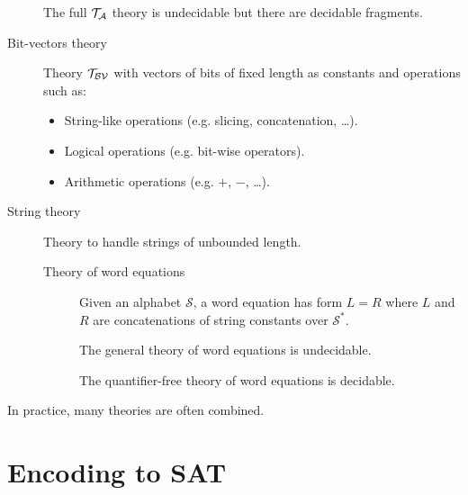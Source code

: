 \begin{description}
        \begin{remark}
            The full $\mathcal{T}_\mathcal{A}$ theory is undecidable but there are decidable fragments.
        \end{remark}


    \item[Bit-vectors theory] 
        Theory $\mathcal{T}_\mathcal{BV}$ with vectors of bits of fixed length as constants and
        operations such as:
        \begin{itemize}
            \item String-like operations (e.g. slicing, concatenation, \dots).
            \item Logical operations (e.g. bit-wise operators).
            \item Arithmetic operations (e.g. $+$, $-$, \dots).
        \end{itemize}


    \item[String theory] 
        Theory to handle strings of unbounded length.

        \begin{description}
            \item[Theory of word equations]
                Given an alphabet $\mathcal{S}$, a word equation has form $L = R$
                where $L$ and $R$ are concatenations of string constants over $\mathcal{S}^*$.

                \begin{remark}
                    The general theory of word equations is undecidable.
                \end{remark}
        
                \begin{remark}
                    The quantifier-free theory of word equations is decidable.
                \end{remark}
        \end{description}
\end{description}

\begin{remark}
    In practice, many theories are often combined.
\end{remark}



\section{Encoding to SAT}


